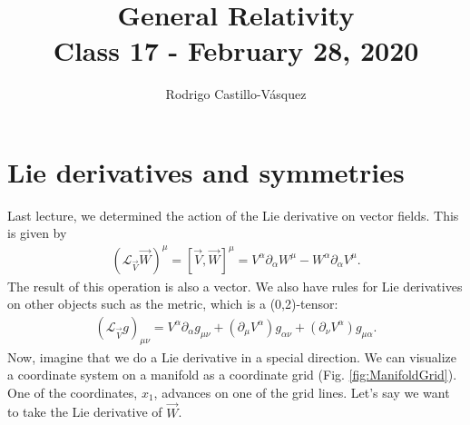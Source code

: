 \documentclass[10pt]{article}
\title{{\Huge General Relativity}\\{\Large{Class 17 - February 28, 2020}}} %
\author{Rodrigo Castillo-V\'asquez}
\begin{document}
    \maketitle
    \flushbottom
    \newpage
    \pagestyle{fancynotes}
     \section{Lie derivatives and symmetries}
     Last lecture, we determined the action of the Lie derivative on vector fields. This is given by
     \begin{align}
	\left( \mathcal{L}_{\vec{V}} \vec{W} \right)^{\mu} = [\vec{V},\vec{W}]^{\mu} = V^{\alpha} \partial_{\alpha} W^{\mu} - W^{\alpha} \partial_{\alpha} V^{\mu}.
	\end{align}
	The result of this operation is also a vector.
    We also have rules for Lie derivatives on other objects such as the metric, which is a (0,2)-tensor:
    \begin{align}
    \left( \mathcal{L}_{\vec{V}} g \right)_{\mu \nu} = V^{\alpha} \partial_{\alpha} g_{\mu \nu} + \left(\partial_{\mu} V^{\alpha} \right) g_{\alpha \nu} + \left(\partial_{\nu} V^{\alpha} \right) g_{\mu \alpha}.
    \end{align}
    Now, imagine that we do a Lie derivative in a special direction. We can visualize a coordinate system on a manifold as a coordinate grid (Fig. \ref{fig:ManifoldGrid}). One of the coordinates, $x_1$, advances on one of the grid lines. Let's say we want to take the Lie derivative of $\vec{W}$.
    
\end{document}
